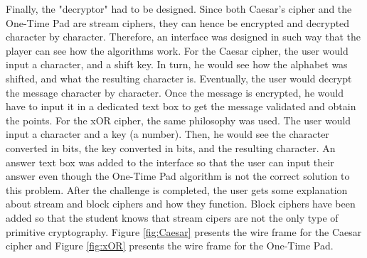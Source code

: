 \documentclass{l4proj}
\begin{document}
Finally, the "decryptor" had to be designed. Since both Caesar's cipher and the One-Time Pad are stream ciphers,
they can hence be encrypted and decrypted character by character. 
Therefore, an interface was designed in such way that the player can see how the algorithms work.
For the Caesar cipher, the user would input a character, and a shift key. 
In turn, he would see how the alphabet was shifted, and what the resulting character is. Eventually,
the user would decrypt the message character by character. 
Once the message is encrypted, he would have to input it in a dedicated text box to get the message validated
and obtain the points. 
For the xOR cipher, the same philosophy was used. The user would input a character and a key (a number).
Then, he would see the character converted in bits, the key converted in bits, and the resulting character.
An answer text box was added to the interface so that the user can input their answer even though
the One-Time Pad algorithm is not the correct solution to this problem.
After the challenge is completed, 
the user gets some explanation about stream and block ciphers and how they function.
Block ciphers have been added so that the student knows that stream cipers are not 
the only type of primitive cryptography.
Figure \ref{fig:Caesar} presents the wire frame for the Caesar cipher 
and Figure \ref{fig:xOR} presents the wire frame for the One-Time Pad.
\end{document}

